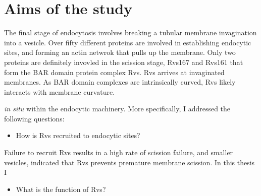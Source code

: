 
\chapter{Aims of the study} %

\label{Ch:Aims} %

The final stage of endocytosis involves breaking a tubular membrane invagination into a vesicle. Over fifty different proteins are involved in establishing endocytic sites, and forming an actin netwrok that pulls up the membrane. Only two proteins are  definitely invovled in the scission stage, Rvs167 and Rvs161 that form the  BAR domain protein complex Rvs. Rvs arrives at invaginated membranes. As BAR domain complexes are intrinsically curved, Rvs likely interacts with membrane curvature. 

 \textit{in situ} within the endocytic machinery. More specifically, I addressed the following questions:

\begin{itemize}
	\item How is Rvs recruited to endocytic sites? 
\end{itemize}

Failure to recruit Rvs results in a high rate of scission failure, and smaller vesicles, indicated that Rvs prevents premature membrane scission. In this thesis I 

\begin{itemize}
	\item What is the function of Rvs?
\end{itemize}